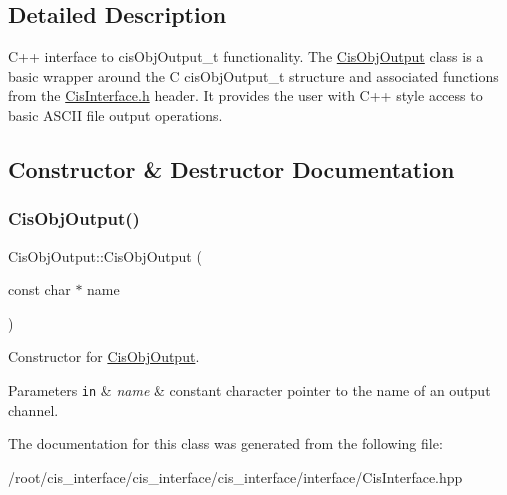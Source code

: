 \subsection{Detailed Description}
C++ interface to cis\+Obj\+Output\+\_\+t functionality. The \mbox{\hyperlink{classCisObjOutput}{Cis\+Obj\+Output}} class is a basic wrapper around the C cis\+Obj\+Output\+\_\+t structure and associated functions from the \mbox{\hyperlink{CisInterface_8h_source}{Cis\+Interface.\+h}} header. It provides the user with C++ style access to basic A\+S\+C\+II file output operations. 

\subsection{Constructor \& Destructor Documentation}
\mbox{\label{classCisObjOutput_afb7eecc9487342188c292e4a6889fee9}} 
\subsubsection{\texorpdfstring{Cis\+Obj\+Output()}{CisObjOutput()}}
{\footnotesize\ttfamily Cis\+Obj\+Output\+::\+Cis\+Obj\+Output (\begin{DoxyParamCaption}\item[{const char $\ast$}]{name }\end{DoxyParamCaption})\hspace{0.3cm}{\ttfamily [inline]}}



Constructor for \mbox{\hyperlink{classCisObjOutput}{Cis\+Obj\+Output}}. 


\begin{DoxyParams}[1]{Parameters}
\mbox{\tt in}  & {\em name} & constant character pointer to the name of an output channel. \\
\hline
\end{DoxyParams}


The documentation for this class was generated from the following file\+:\begin{DoxyCompactItemize}
\item 
/root/cis\+\_\+interface/cis\+\_\+interface/cis\+\_\+interface/interface/Cis\+Interface.\+hpp\end{DoxyCompactItemize}
